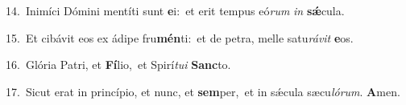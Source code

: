 {\numbfont\textcolor{\numbcolor}{14.}}~Inimíci Dómini mentíti sunt \textbf{e}\-i:~\star et erit tempus eó\textit{rum} \textit{in} \textbf{sǽ}\-cula.\par
{\numbfont\textcolor{\numbcolor}{15.}}~Et cibávit eos ex ádipe fru\-\textbf{mén}\-ti:~\star et de petra, melle satu\-\textit{rá}\-\textit{vit} \textbf{e}\-os.\par
{\numbfont\textcolor{\numbcolor}{16.}}~Glória Patri, et \textbf{Fí}\-lio,~\star et Spirí\-\textit{tu}\-\textit{i} \textbf{Sanc}\-to.\par
{\numbfont\textcolor{\numbcolor}{17.}}~Sicut erat in princípio, et nunc, et \textbf{sem}\-per,~\star et in sǽcula sæcu\-\textit{ló}\-\textit{rum}. \textbf{A}\-men.\par
